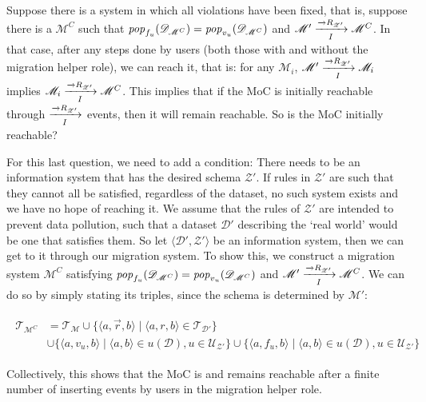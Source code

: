 \documentclass[runningheads]{llncs}
\newcommand{\id}[1]{\text{\it #1\/}}
\newcommand{\popF}[1]{\id{pop}_{#1}}
\newcommand{\pop}[2]{\popF{#1}(#2)}
\newcommand{\viol}[2]{{#1}(#2)}
\newcommand{\pair}[2]{\langle{#1},{#2}\rangle}
\newcommand{\triple}[3]{\langle{#1},{#2},{#3}\rangle}
\newcommand{\rels}{\mathcal{R}}   %
\newcommand{\triples}{\mathcal{T}}
\newcommand{\rules}{\mathcal{U}}
\newcommand{\dataset}{\mathscr{D}}
\newcommand{\schema}{\mathscr{Z}}
\newcommand{\migrsys}{\mathscr{M}}
\begin{document}
   Suppose there is a system in which all violations have been fixed, that is, suppose there is a $\migrsys^C$ such that $\pop{f_u}{\dataset_{\migrsys^C}}=\pop{v_u}{\dataset_{\migrsys^C}}$ and $\migrsys'\xrightarrow[I]{\overrightarrow\rels_{\schema'}} \migrsys^C$.
   In that case, after any steps done by users (both those with and without the migration helper role), we can reach it, that is: for any $\migrsys_i$, $\migrsys'\xrightarrow[I]{\overrightarrow\rels_{\schema'}} \migrsys_i$ implies $\migrsys_i\xrightarrow[I]{\overrightarrow\rels_{\schema'}} \migrsys^C$.
   This implies that if the MoC is initially reachable through $\xrightarrow[I]{\overrightarrow\rels_{\schema'}}$ events, then it will remain reachable.
   So is the MoC initially reachable?
   
   For this last question, we need to add a condition:
   There needs to be an information system that has the desired schema $\schema'$.
   If rules in $\schema'$ are such that they cannot all be satisfied, regardless of the dataset, no such system exists and we have no hope of reaching it.
   We assume that the rules of $\schema'$ are intended to prevent data pollution, such that a dataset $\dataset'$ describing the `real world' would be one that satisfies them.
   So let $\pair{\dataset'}{\schema'}$ be an information system, then we can get to it through our migration system.
   To show this, we construct a migration system $\migrsys^C$ satisfying $\pop{f_u}{\dataset_{\migrsys^C}}=\pop{v_u}{\dataset_{\migrsys^C}}$ and $\migrsys'\xrightarrow[I]{\overrightarrow\rels_{\schema'}} \migrsys^C$.
   We can do so by simply stating its triples, since the schema is determined by $\migrsys'$:
   
   \begin{align}
   \begin{aligned}
   \triples_{\migrsys^C} &= \triples_\migrsys 
   \cup \{\triple{a}{\overrightarrow{r}}{b} \mid \triple{a}{r}{b}\in\triples_{\dataset'}\}\\
   &\cup \{\triple{a}{v_u}{b} \mid \pair{a}{b}\in \viol{u}{\dataset}, u\in \rules_{\schema'} \}
   \cup \{\triple{a}{f_u}{b} \mid \pair{a}{b}\in \viol{u}{\dataset}, u\in \rules_{\schema'} \}
   \end{aligned}
   \end{align}
   
   Collectively, this shows that the MoC is and remains reachable after a finite number of inserting events by users in the migration helper role.
   
\end{document}
